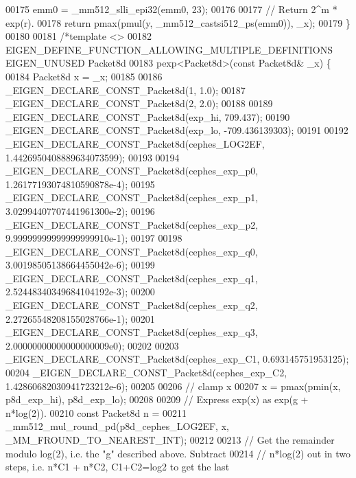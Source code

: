 \begin{DoxyCode}
00175   emm0 = \_mm512\_slli\_epi32(emm0, 23);
00176 
00177   \textcolor{comment}{// Return 2^m * exp(r).}
00178   \textcolor{keywordflow}{return} pmax(pmul(y, \_mm512\_castsi512\_ps(emm0)), \_x);
00179 \}
00180 
00181 \textcolor{comment}{/*template <>}
00182 \textcolor{comment}{EIGEN\_DEFINE\_FUNCTION\_ALLOWING\_MULTIPLE\_DEFINITIONS EIGEN\_UNUSED Packet8d}
00183 \textcolor{comment}{pexp<Packet8d>(const Packet8d& \_x) \{}
00184 \textcolor{comment}{  Packet8d x = \_x;}
00185 \textcolor{comment}{}
00186 \textcolor{comment}{  \_EIGEN\_DECLARE\_CONST\_Packet8d(1, 1.0);}
00187 \textcolor{comment}{  \_EIGEN\_DECLARE\_CONST\_Packet8d(2, 2.0);}
00188 \textcolor{comment}{}
00189 \textcolor{comment}{  \_EIGEN\_DECLARE\_CONST\_Packet8d(exp\_hi, 709.437);}
00190 \textcolor{comment}{  \_EIGEN\_DECLARE\_CONST\_Packet8d(exp\_lo, -709.436139303);}
00191 \textcolor{comment}{}
00192 \textcolor{comment}{  \_EIGEN\_DECLARE\_CONST\_Packet8d(cephes\_LOG2EF, 1.4426950408889634073599);}
00193 \textcolor{comment}{}
00194 \textcolor{comment}{  \_EIGEN\_DECLARE\_CONST\_Packet8d(cephes\_exp\_p0, 1.26177193074810590878e-4);}
00195 \textcolor{comment}{  \_EIGEN\_DECLARE\_CONST\_Packet8d(cephes\_exp\_p1, 3.02994407707441961300e-2);}
00196 \textcolor{comment}{  \_EIGEN\_DECLARE\_CONST\_Packet8d(cephes\_exp\_p2, 9.99999999999999999910e-1);}
00197 \textcolor{comment}{}
00198 \textcolor{comment}{  \_EIGEN\_DECLARE\_CONST\_Packet8d(cephes\_exp\_q0, 3.00198505138664455042e-6);}
00199 \textcolor{comment}{  \_EIGEN\_DECLARE\_CONST\_Packet8d(cephes\_exp\_q1, 2.52448340349684104192e-3);}
00200 \textcolor{comment}{  \_EIGEN\_DECLARE\_CONST\_Packet8d(cephes\_exp\_q2, 2.27265548208155028766e-1);}
00201 \textcolor{comment}{  \_EIGEN\_DECLARE\_CONST\_Packet8d(cephes\_exp\_q3, 2.00000000000000000009e0);}
00202 \textcolor{comment}{}
00203 \textcolor{comment}{  \_EIGEN\_DECLARE\_CONST\_Packet8d(cephes\_exp\_C1, 0.693145751953125);}
00204 \textcolor{comment}{  \_EIGEN\_DECLARE\_CONST\_Packet8d(cephes\_exp\_C2, 1.42860682030941723212e-6);}
00205 \textcolor{comment}{}
00206 \textcolor{comment}{  // clamp x}
00207 \textcolor{comment}{  x = pmax(pmin(x, p8d\_exp\_hi), p8d\_exp\_lo);}
00208 \textcolor{comment}{}
00209 \textcolor{comment}{  // Express exp(x) as exp(g + n*log(2)).}
00210 \textcolor{comment}{  const Packet8d n =}
00211 \textcolor{comment}{      \_mm512\_mul\_round\_pd(p8d\_cephes\_LOG2EF, x, \_MM\_FROUND\_TO\_NEAREST\_INT);}
00212 \textcolor{comment}{}
00213 \textcolor{comment}{  // Get the remainder modulo log(2), i.e. the "g" described above. Subtract}
00214 \textcolor{comment}{  // n*log(2) out in two steps, i.e. n*C1 + n*C2, C1+C2=log2 to get the last}

\end{DoxyCode}
